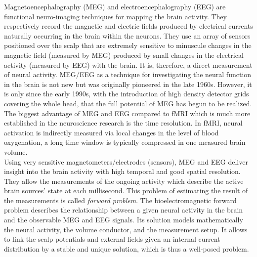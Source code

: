 Magnetoencephalography (MEG) and electroencephalography (EEG) are functional neuro-imaging techniques for mapping the brain activity. They respectively record the magnetic and electric fields produced by electrical currents naturally occurring in the brain within the neurons. They use an array of sensors positioned over the scalp that are extremely sensitive to minuscule changes in the magnetic field (measured by MEG) produced by small changes in the electrical activity (measured by EEG) with the brain. It is, therefore, a direct measurement of neural activity. MEG/EEG as a technique for investigating the neural function in the brain is not new but was originally pioneered in the late 1960s. However, it is only since the early 1990s, with the introduction of high density detector grids covering the whole head, that the full potential of MEG has begun to be realized. The biggest advantage of MEG and EEG compared to fMRI which is much more established in the neuroscience research is the time resolution. In fMRI, neural activation is indirectly measured via local changes in the level of blood oxygenation, a long time window is typically compressed in one measured brain volume. \\

Using very sensitive magnetometers/electrodes (sensors), MEG and EEG deliver insight into the brain activity with high temporal and good spatial resolution. They allow the measurements of the ongoing activity which describe the active brain sources' state at each millisecond. This problem of estimating the result of the measurements is called \textit{forward problem}. The bioelectromagnetic forward problem describes the relationship between a given neural activity in the brain and the observable MEG and EEG signals. Its solution models mathematically the neural activity, the volume conductor, and the measurement setup. It allows to link the scalp potentials and external fields given an internal current distribution by a stable and unique solution, which is thus a well-posed problem. \\

